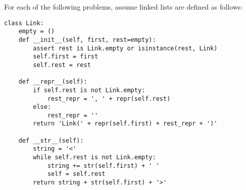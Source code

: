 \vspace{1mm}
For each of the following problems, assume linked lists are defined as follows:
\newline
\begin{lstlisting}
class Link:
    empty = ()
    def __init__(self, first, rest=empty):
        assert rest is Link.empty or isinstance(rest, Link)
        self.first = first
        self.rest = rest

    def __repr__(self):
        if self.rest is not Link.empty:
            rest_repr = ', ' + repr(self.rest)
        else:
            rest_repr = ''
        return 'Link(' + repr(self.first) + rest_repr + ')'

    def __str__(self):
        string = '<'
        while self.rest is not Link.empty:
            string += str(self.first) + ' '
            self = self.rest
        return string + str(self.first) + '>'
        
\end{lstlisting}